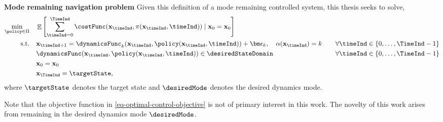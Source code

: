 \documentclass{mimosis-class/mimosis}
\numberwithin{equation}{chapter}
\DeclareMathOperator{\E}{\mathbb{E}}
\newcommand{\modeInd}{\ensuremath{k}}
\newcommand{\mode}[1]{\ensuremath{#1_{\modeInd}}}
\newcommand{\state}{\ensuremath{\mathbf{x}}}
\newcommand{\modeVar}{\ensuremath{\alpha}}
\begin{document}
\begin{myquote}
\textbf{Mode remaining navigation problem}
Given this definition of a mode remaining controlled system, this thesis seeks to solve,
\begin{subequations} \label{eq-main-problem}
\begin{align}
\min_{\policy \in \Pi} \quad
&\E \left[ \sum_{\timeInd=0}^{\TimeInd} \costFunc(\state_{\timeInd}, \pi(\state_{\timeInd}, \timeInd)) \mid \state_0=\state_0 \right] \\
\text{s.t.} \quad &\state_{\timeInd+1} = \mode{\dynamicsFunc}(\state_\timeInd, \policy(\state_\timeInd, \timeInd)) + \mode{\bm\epsilon},
\quad \modeVar(\state_{\timeInd}) = \modeInd \quad &\forall \timeInd \in \{0, \ldots, \TimeInd-1\} \\
&\dynamicsFunc(\state_{\timeInd}, \policy(\state_{\timeInd}, \timeInd))
\in \desiredStateDomain \quad &\forall \timeInd \in \{0, \ldots, \TimeInd-1\} \\
&\state_{0} = \state_0 \\
&\state_\TimeInd = \targetState,
\end{align}
\end{subequations}
where $\targetState$ denotes the target state and $\desiredMode$ denotes the desired dynamics mode.
\end{myquote}
Note that the objective function in \cref{eq-optimal-control-objective} is not of primary interest in this work.
The novelty of this work arises from remaining in the desired dynamics mode \(\desiredMode\).
\end{document}
